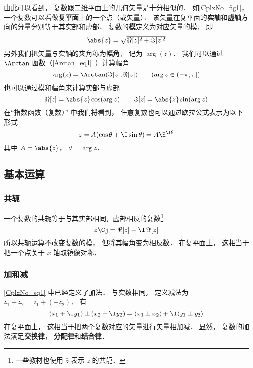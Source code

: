 由此可以看到， 复数跟二维平面上的几何矢量是十分相似的． 如\autoref{CplxNo_fig1}， 一个复数可以看做\textbf{复平面}上的一个点（或矢量）， 该矢量在复平面的\textbf{实轴}和\textbf{虚轴}方向的分量分别等于其实部和虚部． 复数的\textbf{模}定义为对应矢量的模， 即
\begin{equation}
\abs{z} = \sqrt{\Re[z]^2 + \Im[z]^2}
\end{equation}
另外我们把矢量与实轴的夹角称为\textbf{幅角}， 记为 $\arg(z)$． 我们可以通过 $\Arctan$ 函数（\autoref{Arctan_eq1}~）计算幅角
\begin{equation}\label{CplxNo_eq5}
\arg(z) = \Arctan(\Im[z], \Re[z])
\qquad (\arg z \in (-\pi, \pi])
\end{equation}
也可以通过模和幅角来计算实部与虚部
\begin{equation}
\Re[z] = \abs{z}\cos(\arg z) \qquad \Im[z] = \abs{z}\sin(\arg z)
\end{equation}
在“指数函数（复数）” 中我们将看到， 任意复数也可以通过欧拉公式表示为以下形式
\begin{equation}
z = A(\cos\theta + \I\sin\theta) = A\E^{\I\theta}
\end{equation}
其中 $A = \abs{z}$， $\theta = \arg z$．

\subsection{基本运算}
\subsubsection{共轭}
一个复数的共轭等于与其实部相同，虚部相反的复数\footnote{一些教材也使用 $\bar z$ 表示 $z$ 的共轭．}
\begin{equation}\label{CplxNo_eq6}
z\Cj = \Re[z] - \I\, \Im[z]
\end{equation}
所以共轭运算不改变复数的模， 但将其幅角变为相反数． 在复平面上， 这相当于把一个点关于 $x$ 轴取镜像对称．

\subsubsection{加和减}
\autoref{CplxNo_eq1} 中已经定义了加法． 与实数相同， 定义减法为 $z_1 - z_2 = z_1 + (-z_2)$， 有
\begin{equation}
(x_1 + \I y_1) \pm (x_2 + \I y_2) = (x_1 \pm x_2) + \I (y_1 \pm y_2)
\end{equation}
在复平面上， 这相当于把两个复数对应的矢量进行矢量相加减． 显然， 复数的加法满足\textbf{交换律}， \textbf{分配律}和\textbf{结合律}．

